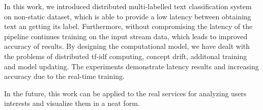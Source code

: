\label {fs-short-conclusion}

In this work, we introduced distributed multi-labelled text classification system on non-static dataset, which is able to provide a low latency between obtaining text an getting its label. Furthermore, without compromising the latency of the pipeline continues training on the input stream data, which leads to improved accuracy of results. By designing the computational model, we have dealt with the problems of distributed tf-idf computing, concept drift, additonal training and model updating. The experiments demonstrate latency results and increasing accuracy due to the real-time training.

In the future, this work can be applied to the real services for analyzing users interests and visualize them in a neat form.